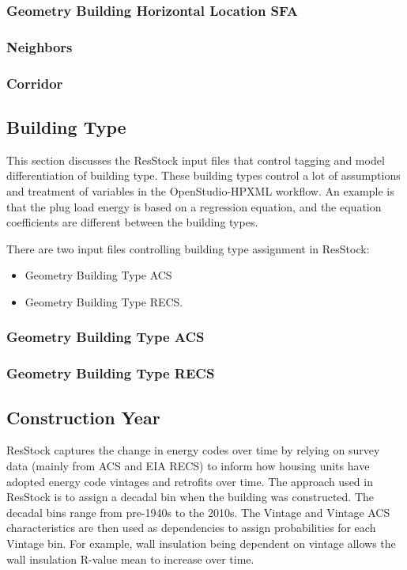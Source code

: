 \subsubsection{Geometry Building Horizontal Location SFA}


\subsubsection{Neighbors}


\subsubsection{Corridor}


\subsection{Building Type}
This section discusses the ResStock input files that control tagging and model differentiation of building type.  These building types control a lot of assumptions and treatment of variables in the OpenStudio-HPXML workflow. An example is that the plug load energy is based on a regression equation, and the equation coefficients are different between the building types.

There are two input files controlling building type assignment in ResStock:

\begin{itemize}
    \item Geometry Building Type ACS
    \item Geometry Building Type RECS.
\end{itemize}

\subsubsection{Geometry Building Type ACS}


\subsubsection{Geometry Building Type RECS}


\subsection{Construction Year}
ResStock captures the change in energy codes over time by relying on survey data (mainly from ACS and EIA RECS) to inform how housing units have adopted energy code vintages and retrofits over time. The approach used in ResStock is to assign a decadal bin when the building was constructed. The decadal bins range from pre-1940s to the 2010s. The Vintage and Vintage ACS characteristics are then used as dependencies to assign probabilities for each Vintage bin. For example, wall insulation being dependent on vintage allows the wall insulation R-value mean to increase over time.

